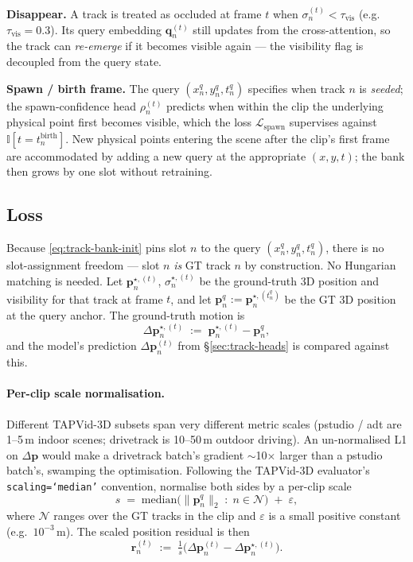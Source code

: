 \documentclass[11pt,a4paper]{article}
\begin{document}
\textbf{Disappear.} A track is treated as occluded at frame $t$ when
$\sigma_n^{(t)} < \tau_{\text{vis}}$ (e.g.\ $\tau_{\text{vis}}=0.3$).
Its query embedding $\bm{q}_n^{(t)}$ still updates from the
cross-attention, so the track can \emph{re-emerge} if it becomes
visible again — the visibility flag is decoupled from the query
state.

\textbf{Spawn / birth frame.} The query $(x_n^{q}, y_n^{q}, t_n^{q})$
specifies when track $n$ is \emph{seeded}; the spawn-confidence head
$\rho_n^{(t)}$ predicts when within the clip the underlying physical
point first becomes visible, which the loss
$\mathcal{L}_{\text{spawn}}$ supervises against
$\mathbb{I}[t = t_n^{\text{birth}}]$. New physical points entering the
scene after the clip's first frame are accommodated by adding a new
query at the appropriate $(x, y, t)$; the bank then grows by one slot
without retraining.

\subsection{Loss}
\label{sec:track-loss}

Because \eqref{eq:track-bank-init} pins slot $n$ to the query $(x_n^{q},
y_n^{q}, t_n^{q})$, there is no slot-assignment freedom — slot $n$
\emph{is} GT track $n$ by construction. No Hungarian matching is
needed. Let $\bm{p}_n^{\star,(t)}$, $\sigma_n^{\star,(t)}$ be the
ground-truth 3D position and visibility for that track at frame $t$,
and let $\bm{p}_n^{q} := \bm{p}_n^{\star,(t_n^{q})}$ be the GT 3D
position at the query anchor. The ground-truth motion is
\begin{equation}\label{eq:track-delta-star}
  \Delta\bm{p}_n^{\star,(t)} \;:=\; \bm{p}_n^{\star,(t)} - \bm{p}_n^{q},
\end{equation}
and the model's prediction $\Delta\bm{p}_n^{(t)}$ from
\S\ref{sec:track-heads} is compared against this.

\paragraph{Per-clip scale normalisation.}
Different TAPVid-3D subsets span very different metric scales
(pstudio / adt are 1--5\,m indoor scenes; drivetrack is 10--50\,m
outdoor driving). An un-normalised L1 on $\Delta\bm{p}$ would make a
drivetrack batch's gradient $\sim$10$\times$ larger than a pstudio
batch's, swamping the optimisation. Following the TAPVid-3D
evaluator's \texttt{scaling=`median'} convention, normalise both
sides by a per-clip scale
\begin{equation}\label{eq:track-scale}
  s \;=\; \mathrm{median}\!\bigl(\|\bm{p}_n^{q}\|_2 \;:\; n \in \mathcal{N}\bigr)
  \;+\; \varepsilon,
\end{equation}
where $\mathcal{N}$ ranges over the GT tracks in the clip and
$\varepsilon$ is a small positive constant (e.g.\ $10^{-3}$\,m). The
scaled position residual is then
\begin{equation}\label{eq:track-resid}
  \bm{r}_n^{(t)} \;:=\; \tfrac{1}{s}\bigl(\Delta\bm{p}_n^{(t)} - \Delta\bm{p}_n^{\star,(t)}\bigr).
\end{equation}
\end{document}
